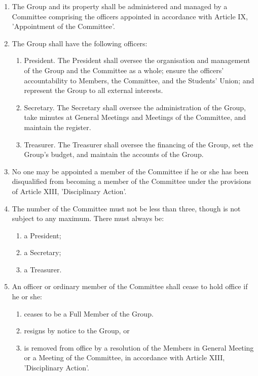 \documentclass[12pt]{constitution}
\begin{document}
\begin{enumerate}
    \item The Group and its property shall be administered and managed by a Committee comprising the officers appointed in accordance with Article IX, 'Appointment of the Committee'.
    \item The Group shall have the following officers:
    \begin{enumerate}
        \item President. The President shall oversee the organisation and management of the Group and the Committee as a whole; ensure the officers' accountability to Members, the Committee, and the Students' Union; and represent the Group to all external interests.
        \item Secretary. The Secretary shall oversee the administration of the Group, take minutes at General Meetings and Meetings of the Committee, and maintain the register.
        \item Treasurer. The Treasurer shall oversee the financing of the Group, set the Group's budget, and maintain the accounts of the Group.
    \end{enumerate}

\item No one may be appointed a member of the Committee if he or she has been disqualified from becoming a member of the Committee under the provisions of Article XIII, 'Disciplinary Action'.
    \item The number of the Committee must not be less than three, though is not subject to any maximum. There must always be:
    \begin{enumerate}
        \item a President;
        \item a Secretary;
        \item a Treasurer.
    \end{enumerate}

    \item An officer or ordinary member of the Committee shall cease to hold office if he or she:
    \begin{enumerate}
        \item ceases to be a Full Member of the Group.
        \item resigns by notice to the Group, or
        \item is removed from office by a resolution of the Members in General Meeting or a Meeting of the Committee, in accordance with Article XIII, 'Disciplinary Action'.
    \end{enumerate}
\end{enumerate}
\end{document}
